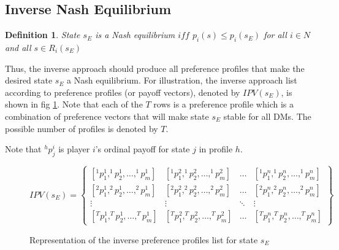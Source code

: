 \documentclass[letterpaper,12pt,titlepage,oneside,final]{book}
\newtheorem{theorem}[lemma]{Theorem}
\newtheorem{definition}[lemma]{Definition}
\begin{document}
\subsection{Inverse Nash Equilibrium}
\begin{definition}
\rm
\label{def:nash_inv1}
State $s_E$ is a Nash equilibrium $iff$ $p_i(s)\leq p_i(s_E)$ for all $i \in N$ and all $s \in R_i(s_E)$


\end{definition}



Thus, the inverse approach should produce all preference profiles that make the desired state $s_E$ a Nash equilibrium. For illustration, the inverse approach list according to preference profiles (or payoff vectors), denoted by $IPV(s_E)$, is shown in fig \ref{fig:IPVil}. Note that each of the $T$ rows is a preference profile which is a combination of preference vectors that will make state $s_E$ stable for all DMs. The possible number of profiles is denoted by $T$. %

\noindent Note that $^hp_j^i$ is player $i$'s ordinal payoff for state $j$ in profile $h$.

\begin{center}
\begin{figure}[H]
\centering


$IPV(s_E)= \begin{Bmatrix}
[^1p_1^1,^1p_2^1, \dots ,^1p_m^1 ] & [^1p_1^2,^1p_2^2, \dots ,^1p_m^2 ] & \dots & [^1p_1^n,^1p_2^n, \dots ,^1p_m^n ] \\ 
[^2p_1^1,^2p_2^1, \dots ,^2p_m^1 ] & [^2p_1^2,^2p_2^2, \dots ,^2p_m^2 ] & \dots & [^2p_1^n,^2p_2^n, \dots ,^2p_m^n ] \\ 
\vdots  & \vdots  & \ddots  & \vdots \\ 
[^Tp_1^1,^Tp_2^1, \dots ,^Tp_m^1 ] & [^Tp_1^2,^Tp_2^2, \dots ,^Tp_m^2 ] & \dots & [^Tp_1^n,^Tp_2^n, \dots ,^Tp_m^n ]
\end{Bmatrix} $



\caption{Representation of the inverse preference profiles list for state $s_E$}

\label{fig:IPVil}
\end{figure}
\end{center}
\end{document}
